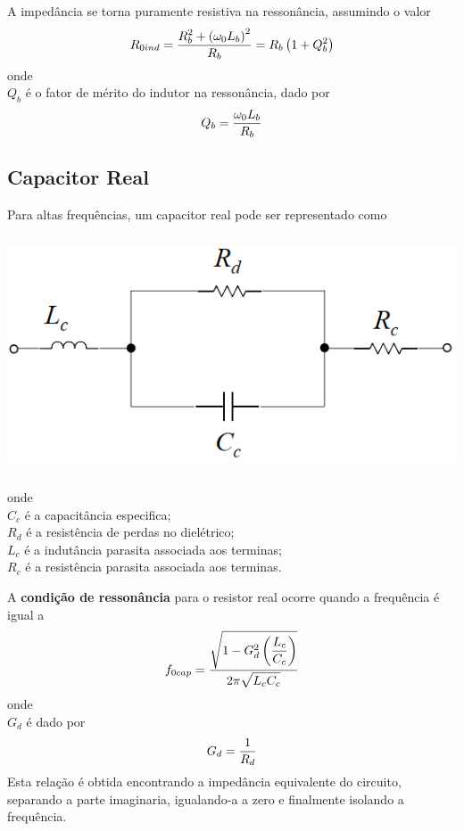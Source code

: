 A impedância se torna puramente resistiva na ressonância, assumindo o valor
\begin{equation}
R_{0ind}=\displaystyle \frac{\displaystyle R_b^2+\left(\omega_0L_b\right)^2 }{ \displaystyle R_b}=R_b\left(1+Q_b^2\right)
\end{equation}
onde\\
$Q_b$ é o fator de mérito do indutor na ressonância, dado por
\begin{equation}
Q_b=\displaystyle \frac{\displaystyle \omega_0L_b }{ \displaystyle R_b}
\end{equation}

\subsection{Capacitor Real}

Para altas frequências, um capacitor real pode ser representado como
\begin{center}
	\includegraphics[height=7cm]{week01_ResumoCapacitorReal.png}
\end{center}
onde \\
$C_c$ é a capacitância especifica;\\
$R_d$ é a resistência de perdas no dielétrico;\\
$L_c$ é a indutância parasita associada aos terminas;\\
$R_c$ é a resistência parasita associada aos terminas.


A \textbf{condição de ressonância} para o resistor real ocorre quando a frequência é igual a
\begin{equation}
f_{0cap}=\displaystyle \frac{\displaystyle \sqrt{1-G_d^2\left(\displaystyle \frac{\displaystyle L_c }{ \displaystyle C_c}\right)} }{ \displaystyle 2\pi\sqrt{L_cC_c}}
\end{equation}
onde\\
$G_d$ é dado por
\begin{equation}
G_d=\displaystyle \frac{\displaystyle 1 }{ \displaystyle R_d}
\end{equation}
Esta relação é obtida encontrando a impedância equivalente do circuito, separando a parte imaginaria, igualando-a a zero e finalmente isolando a frequência.



